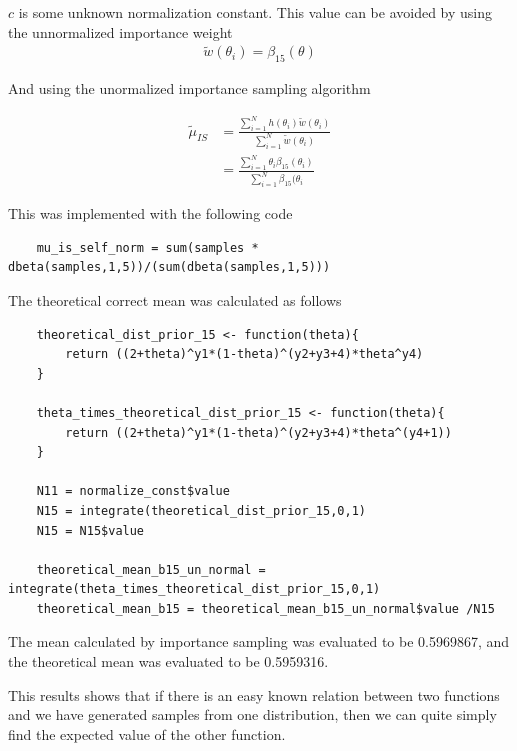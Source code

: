 $c$ is some unknown normalization constant. This value can be avoided by using the unnormalized importance weight
\begin{align}
    \tilde{w}(\theta_i) = \beta_{15}(\theta)
\end{align}

And using the unormalized importance sampling algorithm

\begin{align}
    \tilde{\mu}_{IS} &= \frac{\sum_{i=1}^N h(\theta_i) \tilde{w}(\theta_i)}{\sum_{i=1}^N\tilde{w}(\theta_i)}\\
    &= \frac{\sum_{i=1}^N \theta_i \beta_{15}(\theta_i)}{\sum_{i=1}^N \beta_{15}(\theta_i}
\end{align}

This was implemented with the following code

\begin{lstlisting}
    mu_is_self_norm = sum(samples * dbeta(samples,1,5))/(sum(dbeta(samples,1,5)))
\end{lstlisting}

The theoretical correct mean was calculated as follows

\begin{lstlisting}
    theoretical_dist_prior_15 <- function(theta){
        return ((2+theta)^y1*(1-theta)^(y2+y3+4)*theta^y4)
    }

    theta_times_theoretical_dist_prior_15 <- function(theta){
        return ((2+theta)^y1*(1-theta)^(y2+y3+4)*theta^(y4+1))
    }
    
    N11 = normalize_const$value
    N15 = integrate(theoretical_dist_prior_15,0,1)
    N15 = N15$value

    theoretical_mean_b15_un_normal = integrate(theta_times_theoretical_dist_prior_15,0,1)
    theoretical_mean_b15 = theoretical_mean_b15_un_normal$value /N15
\end{lstlisting}

The mean calculated by importance sampling was evaluated to be 0.5969867, and the theoretical mean was evaluated to be 0.5959316. 

This results shows that if there is an easy known relation between two functions and we have generated samples from one distribution, then we can quite simply find the expected value of the other function. 
